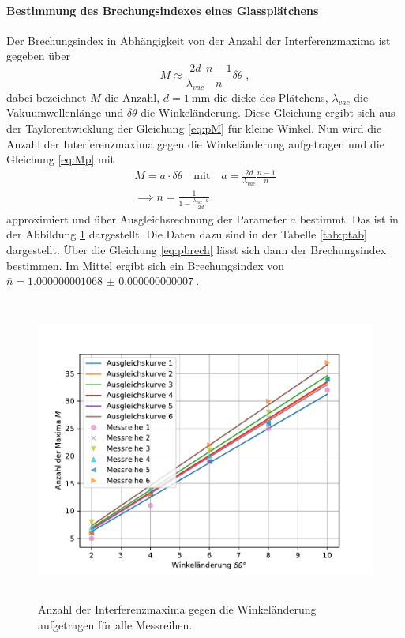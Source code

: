\paragraph{Bestimmung des Brechungsindexes eines Glassplätchens}
Der Brechungsindex in Abhängigkeit von der Anzahl der Interferenzmaxima ist gegeben über
\begin{equation}
M \approx \frac{2d}{\lambda_{vac}} \frac{n-1}{n} \delta \theta \;,
\label{eq:Mp}
\end{equation}
dabei bezeichnet $M$ die Anzahl, $d = \SI{1}{\milli\meter}$ 
die dicke des Plätchens, $\lambda_{vac}$ die Vakuumwellenlänge und 
$\delta \theta$ die Winkeländerung. Diese Gleichung ergibt sich aus der Taylorentwicklung der 
Gleichung \eqref{eq:pM} für kleine Winkel.
Nun wird die Anzahl der Interferenzmaxima gegen die Winkeländerung aufgetragen und die Gleichung 
\eqref{eq:Mp} mit 
\begin{gather}
M = a \cdot \delta\theta \quad \text{mit} \quad a =\frac{2d}{\lambda_{vac}} \frac{n-1}{n}
\label{eq:pfit} \\
\implies n = \frac{1}{1-\frac{\lambda_{vac} \cdot a}{2d}} 
\label{eq:pbrech}
\end{gather}
approximiert und über Ausgleichsrechnung der Parameter $a$ bestimmt. Das ist in der Abbildung 
\ref{fig:pfit} dargestellt. Die Daten dazu sind in der Tabelle \ref{tab:ptab} dargestellt.
Über die Gleichung \eqref{eq:pbrech} lässt sich dann der Brechungsindex bestimmen. Im Mittel 
ergibt sich ein Brechungsindex von $\bar{n} = \SI{1.000000001068(7)}{}$. 
\begin{figure}
  \centering
  \includegraphics[height = 10cm]{plots/Plaettchenplot.pdf}
  \caption{Anzahl der Interferenzmaxima gegen die Winkeländerung aufgetragen für alle Messreihen.}
  \label{fig:pfit}
\end{figure}
